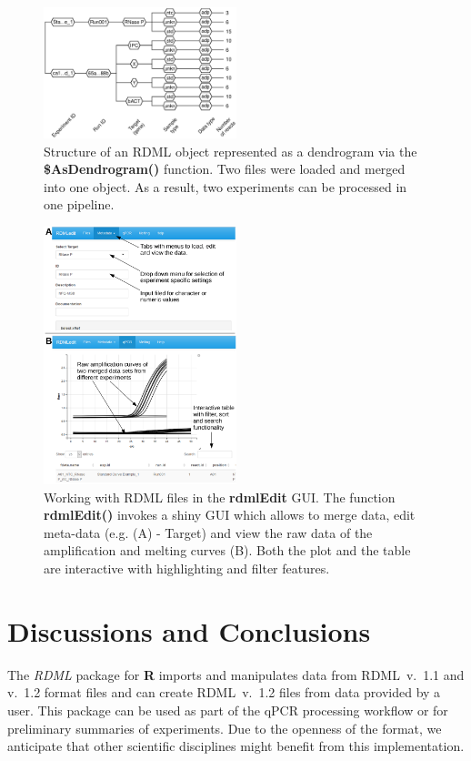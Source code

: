 \documentclass{bioinfo}
\begin{document}
\begin{figure}
\includegraphics[width=0.5\textwidth]{as_dendrogram.eps}
\caption{Structure of an RDML object represented as a dendrogram via the 
	\textbf{\$AsDendrogram()} function. Two files 
	were loaded and merged into one object. As a result, two 
	experiments can be processed in one pipeline.}\label{fig:01}
\end{figure}
\begin{figure}
\includegraphics[width=0.5\textwidth]{figure_gui.pdf}
\caption{Working with RDML files in the \textbf{rdmlEdit} GUI. 
	The function \textbf{rdmlEdit()} invokes a shiny GUI which allows to merge data, edit meta-data (e.g. (A) - Target) and view the raw 
	data of the amplification and melting curves (B). Both the plot and 
	the table are interactive with highlighting and filter features.}\label{fig:02}
\end{figure}

\section{Discussions and Conclusions}
The \textit{RDML} package for \textbf{R} imports and manipulates data 
from RDML~v.~1.1 and v.~1.2 format files and can  create RDML~v.~1.2 files 
from data provided by a user. This package can be used as  part of the qPCR 
processing workflow or for preliminary summaries of experiments. Due to the 
openness of the format, we anticipate that other scientific disciplines might 
benefit from this implementation.
\end{document}
